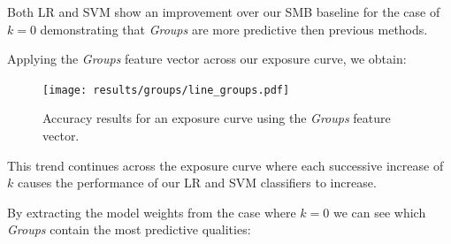 Both LR and SVM show an improvement over our SMB baseline for the case of $k = 0$ demonstrating that \emph{Groups} are more predictive then 
previous methods.

\clearpage

Applying the \emph{Groups} feature vector across our exposure curve, we obtain:

\begin{figure}[h]
	\begin{center}
		\texttt{[image: results/groups/line\_groups.pdf]}
		\caption{Accuracy results for an exposure curve using the \emph{Groups} feature vector.}
	\end{center}
\end{figure}

This trend continues across the exposure curve where each successive increase of $k$ causes the performance of our LR and SVM classifiers to 
increase.

\clearpage

By extracting the model weights from the case where $k=0$ we can see which \emph{Groups} contain the most predictive qualities:

